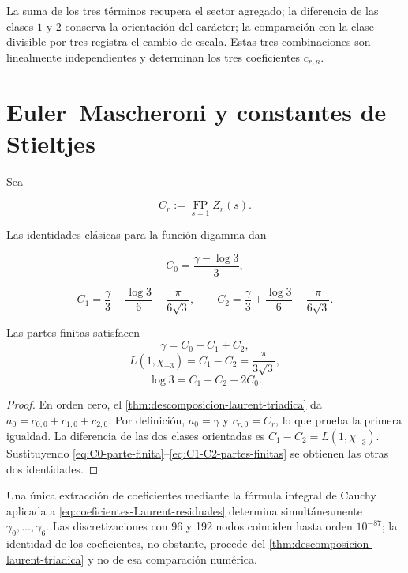 La suma de los tres términos recupera el sector agregado; la diferencia de
las clases $1$ y $2$ conserva la orientación del carácter; la comparación
con la clase divisible por tres registra el cambio de escala. Estas tres
combinaciones son linealmente independientes y determinan los tres
coeficientes $c_{r,n}$.

\section{Euler--Mascheroni y constantes de Stieltjes}

Sea

\[
 C_r:=\operatorname*{FP}_{s=1}Z_r(s).
\]

Las identidades clásicas para la función digamma dan
\cite{Apostol1976,Lagarias2013}

\begin{equation}
 C_0=\frac{\gamma-\log3}{3},
 \label{eq:C0-parte-finita}
\end{equation}

\begin{equation}
 C_1=\frac\gamma3+\frac{\log3}{6}+\frac{\pi}{6\sqrt3},
 \qquad
 C_2=\frac\gamma3+\frac{\log3}{6}-\frac{\pi}{6\sqrt3}.
 \label{eq:C1-C2-partes-finitas}
\end{equation}

\begin{corollary}
\label{cor:gamma-log3-L1}
Las partes finitas satisfacen
\[
 \boxed{\gamma=C_0+C_1+C_2},
\]
\[
 \boxed{L(1,\chi_{-3})=C_1-C_2=\frac{\pi}{3\sqrt3}},
\]
\[
 \boxed{\log3=C_1+C_2-2C_0}.
\]
\end{corollary}

\begin{proof}
En orden cero, el \cref{thm:descomposicion-laurent-triadica} da
$a_0=c_{0,0}+c_{1,0}+c_{2,0}$. Por definición,
$a_0=\gamma$ y $c_{r,0}=C_r$, lo que prueba la primera igualdad. La
diferencia de las dos clases orientadas es
$C_1-C_2=L(1,\chi_{-3})$. Sustituyendo
\eqref{eq:C0-parte-finita}--\eqref{eq:C1-C2-partes-finitas} se obtienen las
otras dos identidades.
\end{proof}

Una única extracción de coeficientes mediante la fórmula integral de
Cauchy aplicada a \eqref{eq:coeficientes-Laurent-residuales} determina
simultáneamente $\gamma_0,\ldots,\gamma_6$. Las discretizaciones con 96 y
192 nodos coinciden hasta orden $10^{-87}$; la identidad de los
coeficientes, no obstante, procede del
\cref{thm:descomposicion-laurent-triadica} y no de esa comparación numérica.

